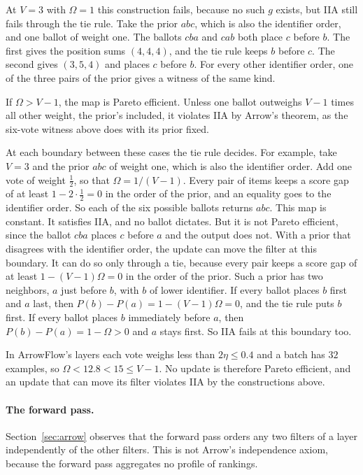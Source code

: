 At $V=3$ with $\Omega=1$ this construction fails, because no such $g$ exists, but IIA still fails through the tie rule. Take the prior $abc$, which is also the identifier order, and one ballot of weight one. The ballots $cba$ and $cab$ both place $c$ before $b$. The first gives the position sums $(4,4,4)$, and the tie rule keeps $b$ before $c$. The second gives $(3,5,4)$ and places $c$ before $b$. For every other identifier order, one of the three pairs of the prior gives a witness of the same kind.

If $\Omega>V-1$, the map is Pareto efficient. Unless one ballot outweighs $V-1$ times all other weight, the prior's included, it violates IIA by Arrow's theorem, as the six-vote witness above does with its prior fixed.

At each boundary between these cases the tie rule decides. For example, take $V=3$ and the prior $abc$ of weight one, which is also the identifier order. Add one vote of weight $\tfrac12$, so that $\Omega=1/(V-1)$. Every pair of items keeps a score gap of at least $1-2\cdot\tfrac12=0$ in the order of the prior, and an equality goes to the identifier order. So each of the six possible ballots returns $abc$. This map is constant. It satisfies IIA, and no ballot dictates. But it is not Pareto efficient, since the ballot $cba$ places $c$ before $a$ and the output does not. With a prior that disagrees with the identifier order, the update can move the filter at this boundary. It can do so only through a tie, because every pair keeps a score gap of at least $1-(V-1)\Omega=0$ in the order of the prior. Such a prior has two neighbors, $a$ just before $b$, with $b$ of lower identifier. If every ballot places $b$ first and $a$ last, then $P(b)-P(a)=1-(V-1)\Omega=0$, and the tie rule puts $b$ first. If every ballot places $b$ immediately before $a$, then $P(b)-P(a)=1-\Omega>0$ and $a$ stays first. So IIA fails at this boundary too.

In ArrowFlow's layers each vote weighs less than $2\eta\le0.4$ and a batch has $32$ examples, so $\Omega<12.8<15\le V-1$. No update is therefore Pareto efficient, and an update that can move its filter violates IIA by the constructions above.



\paragraph{The forward pass.} Section~\ref{sec:arrow} observes that the forward pass orders any two filters of a layer independently of the other filters. This is not Arrow's independence axiom, because the forward pass aggregates no profile of rankings.

